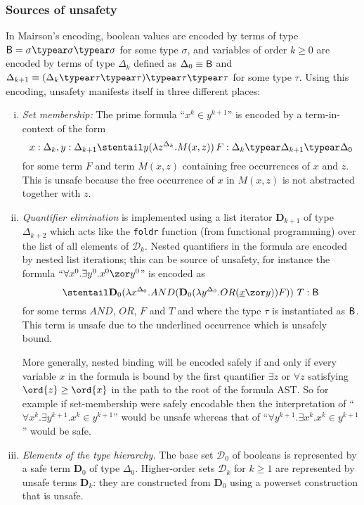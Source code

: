 \subsubsection{Sources of unsafety}
In Mairson's encoding, boolean values are encoded by terms of type
$\booltype = \sigma \typear \sigma\typear \sigma$ for some type
$\sigma$, and variables of order $k \geq 0$ are encoded by terms of
type $\Delta_k$ defined as $\Delta_0 \equiv \mathsf{B}$ and
$\Delta_{k+1} \equiv (\Delta_k \typear \tau \typear \tau)\typear \tau \typear
\tau$ for some type $\tau$. Using this encoding, unsafety manifests
itself in three different places:
\begin{enumerate}[(i)]
  \item \emph{Set membership:} The prime formula ``$x^k \in y^{k+1}$'' is encoded by a term-in-context of the form
      \begin{equation} x: \Delta_k, y:\Delta_{k+1} \stentail y (\lambda z^{\Delta_k} . M(x,z))\,F : \Delta_k \typear \Delta_{k+1} \typear \Delta_0 \label{eqn:setmembership}\end{equation}
for some term $F$ and term $M(x,z)$ containing free occurrences of $x$ and $z$.
This is unsafe because the free occurrence of $x$ in $M(x,z)$ is not abstracted together with $z$.

\item \emph{Quantifier elimination} is implemented using a list iterator $\mathbf{D}_{k+1}$ of type $\Delta_{k+2}$ which acts like the {\tt foldr} function (from functional programming) over the list of all elements of $\mathcal{D}_k$.
Nested quantifiers in the formula are encoded by nested list iterations; this can be source of unsafety, for instance the formula ``$\forall x^0 . \exists y^0 . x^0 \zor y^0$'' is encoded as $$\stentail \mathbf{D}_0 (\lambda
x^{\Delta_0}. AND (\mathbf{D}_0 (\lambda y^{\Delta_0}. OR
(\underline{x} \zor y)) F))\ T : \booltype$$
for some terms $AND$, $OR$, $F$ and $T$ and where the type
$\tau$ is instantiated as $\mathsf{B}$. This term is unsafe due to
the underlined occurrence which is unsafely bound.

More generally, nested binding will be encoded safely if and only if every variable $x$ in the formula is bound by the first quantifier $\exists z$ or
$\forall z$ satisfying $\ord{z} \geq \ord{x}$ in the path to the root of the formula AST. So for example if set-membership
were safely encodable then the interpretation of ``$\forall x^k
. \exists y^{k+1} . x^k \in y^{k+1}$'' would be unsafe whereas that of ``$\forall y^{k+1} . \exists x^k . x^k \in y^{k+1}$''
would be safe.

\item \emph{Elements of the type hierarchy.} The base set $\mathcal{D}_0$ of booleans is represented by a safe term $\mathbf{D}_0$ of type $\Delta_0$. Higher-order sets $\mathcal{D}_k$ for $k\geq 1$ are represented by unsafe terms $\mathbf{D}_k$: they are constructed from $\mathbf{D}_0$ using a powerset construction that is unsafe.
\end{enumerate}
\bigskip

